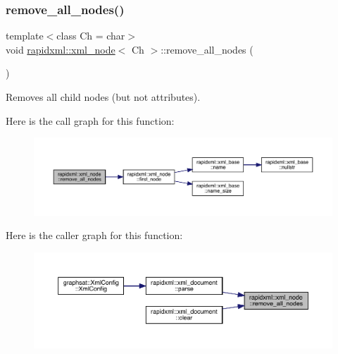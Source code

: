 \subsubsection{\texorpdfstring{remove\_all\_nodes()}{remove\_all\_nodes()}}
{\footnotesize\ttfamily template$<$class Ch = char$>$ \\
void \mbox{\hyperlink{classrapidxml_1_1xml__node}{rapidxml\+::xml\+\_\+node}}$<$ Ch $>$\+::remove\+\_\+all\+\_\+nodes (\begin{DoxyParamCaption}{ }\end{DoxyParamCaption})\hspace{0.3cm}{\ttfamily [inline]}}



Removes all child nodes (but not attributes). 

Here is the call graph for this function\+:\nopagebreak
\begin{figure}[H]
\begin{center}
\leavevmode
\includegraphics[width=350pt]{classrapidxml_1_1xml__node_a95735358b079ae0adcfbbac69aa1fbc3_cgraph}
\end{center}
\end{figure}
Here is the caller graph for this function\+:\nopagebreak
\begin{figure}[H]
\begin{center}
\leavevmode
\includegraphics[width=350pt]{classrapidxml_1_1xml__node_a95735358b079ae0adcfbbac69aa1fbc3_icgraph}
\end{center}
\end{figure}
\mbox{\label{classrapidxml_1_1xml__node_a6f97b1b4f46a94a4587915df3c0c6b57}} 
